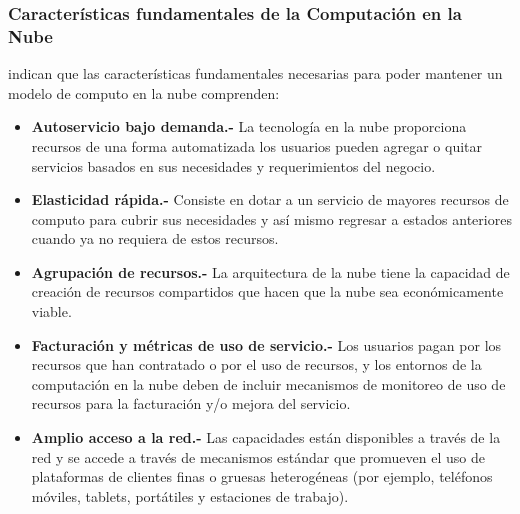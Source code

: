 \subsubsection{Características fundamentales de la Computación en la Nube}
\cite{nist} indican que las características fundamentales necesarias para poder
mantener un modelo de computo en la nube comprenden:
\begin{itemize}
    \item \textbf{Autoservicio bajo demanda.-} La tecnología en la nube
          proporciona recursos de una forma automatizada los usuarios pueden
          agregar o quitar servicios basados en sus necesidades y requerimientos
          del negocio.
    \item \textbf{Elasticidad rápida.-} Consiste en dotar a un servicio de mayores
          recursos de computo para cubrir sus necesidades y así mismo regresar
          a estados anteriores cuando ya no requiera de estos recursos.
    \item \textbf{Agrupación de recursos.-} La arquitectura de la nube tiene la capacidad
          de creación de recursos compartidos que hacen que la nube sea
          económicamente viable.
    \item \textbf{Facturación y métricas de uso de servicio.-} Los usuarios
          pagan por los recursos que han contratado o por el uso de recursos, y
          los entornos de la computación en la nube deben de incluir mecanismos de monitoreo
          de uso de recursos para la facturación y/o mejora del servicio.
    \item \textbf{Amplio acceso a la red.-} Las capacidades están disponibles
          a través de la red y se accede a través de mecanismos estándar
          que promueven el uso de plataformas de clientes finas o gruesas
          heterogéneas (por ejemplo, teléfonos móviles, tablets, portátiles
          y estaciones de trabajo).
\end{itemize}
